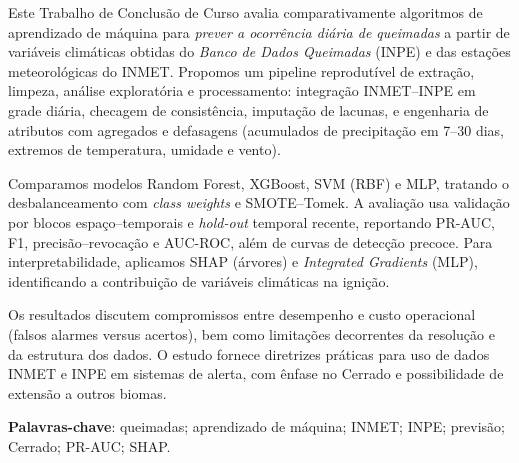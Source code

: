 \begin{resumo}
Este Trabalho de Conclusão de Curso avalia comparativamente algoritmos de aprendizado de máquina para \textit{prever a ocorrência diária de queimadas} a partir de variáveis climáticas obtidas do \textit{Banco de Dados Queimadas} (INPE) e das estações meteorológicas do INMET. Propomos um pipeline reprodutível de extração, limpeza, análise exploratória e processamento: integração INMET–INPE em grade diária, checagem de consistência, imputação de lacunas, e engenharia de atributos com agregados e defasagens (acumulados de precipitação em 7–30 dias, extremos de temperatura, umidade e vento). 

Comparamos modelos Random Forest, XGBoost, SVM (RBF) e MLP, tratando o desbalanceamento com \textit{class weights} e SMOTE–Tomek. A avaliação usa validação por blocos espaço–temporais e \textit{hold-out} temporal recente, reportando PR-AUC, F1, precisão–revocação e AUC-ROC, além de curvas de detecção precoce. Para interpretabilidade, aplicamos SHAP (árvores) e \textit{Integrated Gradients} (MLP), identificando a contribuição de variáveis climáticas na ignição. 

Os resultados discutem compromissos entre desempenho e custo operacional (falsos alarmes versus acertos), bem como limitações decorrentes da resolução e da estrutura dos dados. O estudo fornece diretrizes práticas para uso de dados INMET e INPE em sistemas de alerta, com ênfase no Cerrado e possibilidade de extensão a outros biomas.
\vspace{1em}

\textbf{Palavras-chave}: queimadas; aprendizado de máquina; INMET; INPE; previsão; Cerrado; PR-AUC; SHAP.
\end{resumo}
